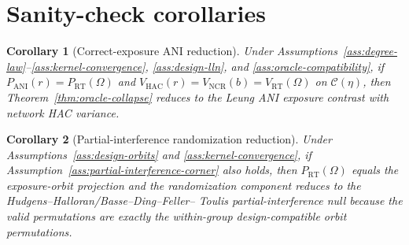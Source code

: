 \documentclass[11pt]{article}
\theoremstyle{definition}
\theoremstyle{plain}
\newtheorem{corollary}{Corollary}
\theoremstyle{remark}
\begin{document}
\section{Sanity-check corollaries}
\begin{corollary}[Correct-exposure ANI reduction]\label{cor:ani-reduction}
Under Assumptions~\ref{ass:degree-law}--\ref{ass:kernel-convergence},
\ref{ass:design-lln}, and \ref{ass:oracle-compatibility}, if
\(P_{\mathrm{ANI}}(r)=P_{\mathrm{RT}}(\Omega)\) and
\(V_{\mathrm{HAC}}(r)=V_{\mathrm{NCR}}(b)=V_{\mathrm{RT}}(\Omega)\) on
\(\mathcal C(\eta)\), then
Theorem~\ref{thm:oracle-collapse} reduces to the Leung ANI exposure contrast
with network HAC variance.
\end{corollary}

\begin{corollary}[Partial-interference randomization reduction]\label{cor:partial-interference}
Under Assumptions~\ref{ass:design-orbits} and \ref{ass:kernel-convergence}, if
Assumption~\ref{ass:partial-interference-corner} also holds, then
\(P_{\mathrm{RT}}(\Omega)\) equals the exposure-orbit projection and the
randomization component reduces to the Hudgens--Halloran/Basse--Ding--Feller--
Toulis partial-interference null because the valid permutations are exactly
the within-group design-compatible orbit permutations.
\end{corollary}
\end{document}
